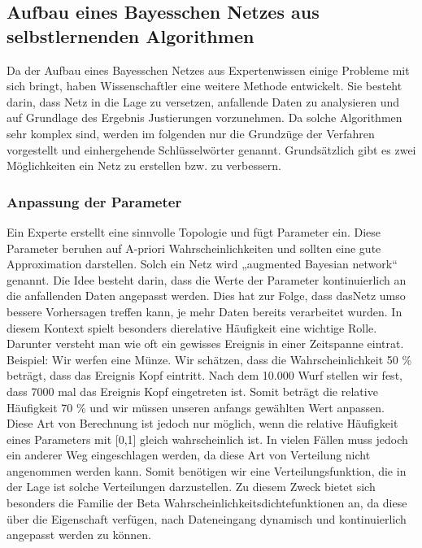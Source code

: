 \subsection{Aufbau eines Bayesschen Netzes aus selbstlernenden Algorithmen} 
Da der Aufbau eines Bayesschen Netzes aus Expertenwissen einige Probleme mit sich bringt, haben Wissenschaftler eine weitere Methode
entwickelt. Sie besteht darin, dass Netz in die Lage zu versetzen, anfallende Daten zu analysieren und auf Grundlage des Ergebnis
Justierungen vorzunehmen. Da solche Algorithmen sehr komplex sind, werden im folgenden nur die Grundzüge der Verfahren vorgestellt
und einhergehende Schlüsselwörter genannt. Grundsätzlich gibt es zwei Möglichkeiten ein Netz zu erstellen bzw. zu verbessern.

\subsubsection{Anpassung der Parameter}
Ein Experte erstellt eine sinnvolle Topologie und fügt Parameter ein. Diese Parameter beruhen auf A-priori Wahrscheinlichkeiten und 
sollten eine gute Approximation darstellen. Solch ein Netz wird „augmented Bayesian network“ genannt. Die Idee besteht darin,
dass die Werte der Parameter kontinuierlich an die anfallenden Daten angepasst werden. Dies hat zur Folge, dass dasNetz umso bessere
Vorhersagen treffen kann, je mehr Daten bereits verarbeitet wurden. In diesem Kontext spielt besonders dierelative Häufigkeit
eine wichtige Rolle. Darunter versteht man wie oft ein gewisses Ereignis in einer Zeitspanne eintrat.\\
Beispiel: Wir werfen eine Münze. Wir schätzen, dass die Wahrscheinlichkeit 50 \% beträgt, dass das Ereignis Kopf eintritt. Nach dem 
10.000 Wurf stellen wir fest, dass 7000 mal das Ereignis Kopf eingetreten ist. Somit beträgt die relative Häufigkeit 70 \% und wir
müssen unseren anfangs gewählten Wert anpassen. \\
Diese Art von Berechnung ist jedoch nur möglich, wenn die relative Häufigkeit eines Parameters mit  [0,1] gleich wahrscheinlich ist. 
In vielen Fällen muss jedoch ein anderer Weg eingeschlagen werden, da diese Art von Verteilung nicht angenommen werden kann. Somit
benötigen wir eine Verteilungsfunktion, die in der Lage ist solche Verteilungen darzustellen.
Zu diesem Zweck bietet sich besonders die Familie der Beta Wahrscheinlichkeitsdichtefunktionen an, da diese über die Eigenschaft
verfügen, nach Dateneingang dynamisch und kontinuierlich angepasst werden zu können. 

